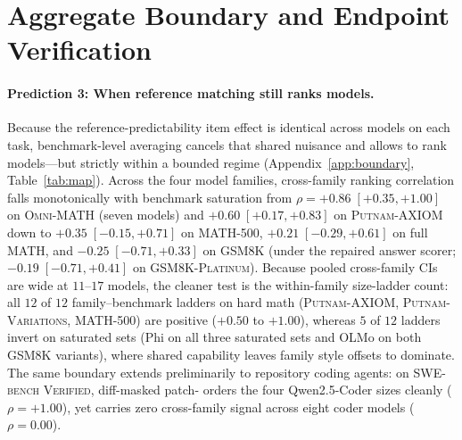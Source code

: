 \section{Aggregate Boundary and Endpoint Verification}
\label{sec:boundary-verify}

\paragraph{Prediction 3: When reference matching still ranks models.}
Because the reference-predictability item effect is identical across models on each task, benchmark-level averaging cancels that shared nuisance and allows \tfa{} to rank models---but strictly within a bounded regime (Appendix~\ref{app:boundary}, Table~\ref{tab:map}).
Across the four model families, cross-family ranking correlation falls monotonically with benchmark saturation from $\rho = +0.86 \; [+0.35, +1.00]$ on \textsc{Omni-MATH} (seven models) and $+0.60 \; [+0.17, +0.83]$ on \textsc{Putnam-AXIOM} down to $+0.35 \; [-0.15, +0.71]$ on \textsc{MATH-500}, $+0.21 \; [-0.29, +0.61]$ on full \textsc{MATH}, and $-0.25 \; [-0.71, +0.33]$ on \textsc{GSM8K} (under the repaired answer scorer; $-0.19 \; [-0.71, +0.41]$ on \textsc{GSM8K-Platinum}).
Because pooled cross-family CIs are wide at $11$--$17$ models, the cleaner test is the within-family size-ladder count: all $12$ of $12$ family--benchmark ladders on hard math (\textsc{Putnam-AXIOM}, \textsc{Putnam-Variations}, \textsc{MATH-500}) are positive ($+0.50$ to $+1.00$), whereas $5$ of $12$ ladders invert on saturated sets (Phi on all three saturated sets and OLMo on both \textsc{GSM8K} variants), where shared capability leaves family style offsets to dominate.
The same boundary extends preliminarily to repository coding agents: on \textsc{SWE-bench Verified}, diff-masked patch-\tfa{} orders the four Qwen2.5-Coder sizes cleanly ($\rho = +1.00$), yet carries zero cross-family signal across eight coder models ($\rho = 0.00$).

